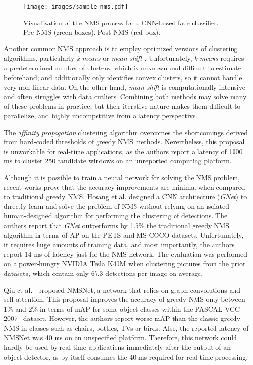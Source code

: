 \begin{figure}[t]
  \centering
  \texttt{[image: images/sample\_nms.pdf]}
  \caption{\label{fig:nmsab} Visualization of the NMS process for a CNN-based face classifier. Pre-NMS (green boxes). Post-NMS (red box).}
\end{figure}

Another common NMS approach is to employ optimized versions of clustering algorithms, particularly \emph{k-means} \cite{shalom2008efficient} or 
\emph{mean shift} \cite{li2009mean}. Unfortunately, \emph{k-means} requires a predetermined number of clusters, which is unknown and difficult to estimate beforehand; 
and additionally only identifies convex clusters, so it cannot handle very non-linear data. On the other hand, \emph{mean shift} is computationally intensive and often 
struggles with data outliers. Combining both methods may solve many of these problems in practice, but their iterative nature makes them difficult to parallelize, and 
highly uncompetitive from a latency perspective.

The \emph{affinity propagation} clustering algorithm \cite{rothe2014nms} overcomes the shortcomings derived from hard-coded thresholds of greedy NMS methods. Nevertheless, 
this proposal is unworkable for real-time applications, as the authors report a latency of 1000 ms to cluster 250 candidate windows on an unreported computing platform.

Although it is possible to train a neural network for solving the NMS problem, recent works prove that the accuracy improvements are minimal when compared 
to traditional greedy NMS. Hosang et al. \cite{hosang2017learning} designed a CNN architecture (\emph{GNet}) to directly learn and solve the problem of 
NMS without relying on an isolated  human-designed algorithm for performing the clustering of detections. The authors report that \emph{GNet} outperforms by 1.6\% the 
traditional greedy NMS algorithm in terms of AP on the PETS \cite{ellis2010pets2010} and MS COCO \cite{lin2014microsoft} datasets. Unfortunately, it requires 
huge amounts of training data, and most importantly, the authors report 14 ms of latency just for the NMS network. The evaluation was performed 
on a power-hungry NVIDIA Tesla K40M when clustering pictures from the prior datasets, which contain only 67.3 detections per image on average.

Qiu et al.~\cite{qiu2019graph} proposed NMSNet, a network that relies on graph convolutions and self attention. This proposal improves the 
accuracy of greedy NMS only between 1\% and 2\% in terms of mAP for some object classes within the PASCAL VOC 2007~\cite{everingham2010pascal} dataset. However, the authors 
report worse mAP than the classic greedy NMS in classes such as chairs, bottles, TVs or birds. Also, the reported latency of NMSNet was 40 ms on an unspecified platform. 
Therefore, this network could hardly be used by real-time applications immediately after the output of an object detector, as by itself consumes the 40 ms required for 
real-time processing.

